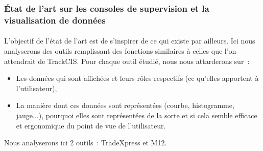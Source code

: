		\subsubsection{État de l'art sur les consoles de supervision et la visualisation de données}
			\paragraph{}
			L'objectif de l'état de l'art est de s'inspirer de ce qui existe par
			ailleurs.
			Ici nous analyserons des outils remplissant des
			fonctions similaires à celles que l’on attendrait de TrackCIS. Pour chaque
			outil étudié, nous nous attarderons sur~:
			\begin{itemize}
			  \item Les données qui sont affichées et leurs rôles respectifs (ce qu'elles
			  apportent à l'utilisateur),
			  \item La manière dont ces données sont représentées (courbe, histogramme,
			  jauge...), pourquoi elles sont représentées de la sorte et si cela semble
			  efficace et ergonomique du point de vue de l’utilisateur.
			\end{itemize}
			Nous analyserons ici 2 outils~: TradeXpress et M12.
			
